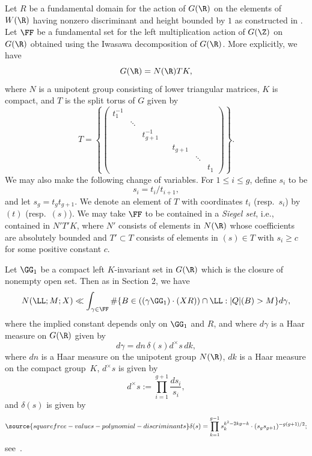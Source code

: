 Let $R$ be a fundamental domain for the action of $G(\R)$ on the elements of $W(\R)$ having nonzero discriminant and height bounded by $1$ as constructed in \cite[\S4.1]{SW}. Let $\FF$ be a fundamental set for the left multiplication action of $G(\Z)$ on $G(\R)$ obtained using the Iwasawa decomposition of $G(\R)$. More explicitly, we have
$$
G(\R)=N(\R)TK,
$$ where $N$ is a unipotent group consisting of lower triangular matrices, $K$ is compact, and $T$ is the split torus of $G$ given by
\begin{equation*}
T=
\left\{\left(\begin{array}{ccccccc}
 t_1^{-1}&&&&&&\\
&\ddots &&&&&  \\
 && t_{g+1}^{-1} &&&&\\
 &&&& \!\!\!\!t_{g+1} &&\\
&&&&&\!\!\!\!\ddots &  \\
& &&&&& \!\!t_{1}
\end{array}\right)\right\}.
\end{equation*}
We may also make the following change of variables.
For $1\leq
i\leq g$, define $s_i$ to be
$$
s_i=t_i/t_{i+1},
$$
and let $s_g=t_gt_{g+1}$.
We denote an element of $T$ with coordinates $t_i$
(resp.\ $s_i$) by $(t)$ (resp.\ $(s)$). We may take $\FF$ to be contained in a {\it Siegel set}, i.e., contained in $N'T'K$,
where $N'$ consists of elements in $N(\R)$ whose coefficients are
absolutely bounded and $T'\subset T$ consists of elements in $(s)\in
T$ with $s_i\geq c$ for some positive constant $c$.

Let $\GG_1$ be a compact left $K$-invariant set in $G(\R)$ which is the closure of nonempty open set. Then as in Section 2, we have
\begin{equation}
  N(\LL;M;X)\ll \int_{\gamma\in\FF} \#\{B\in((\gamma \GG_1)\cdot (XR))\cap\LL:|Q|(B)>M\}
  d\gamma,
\end{equation}
where the implied constant depends only on $\GG_1$ and $R$, and where $d\gamma$ is a Haar measure on $G(\R)$ given by
$$
d\gamma=dn\,\delta(s)d^\times s\,dk,
$$ where $dn$ is a Haar measure on the unipotent group $N(\R)$,
$dk$ is a Haar measure on the compact group~$K$, $d^\times s$ is
given by
$$
d^\times s:=\prod_{i=1}^{g+1}\frac{ds_i}{s_i},
$$
and
$\delta(s)$ is given by
\begin{equation}\label{eqhaareven}
\source{squarefree-values-polynomial-discriminants}
  \delta(s)=\prod_{k=1}^{g-1} s_k^{k^2-2kg-k}\cdot (s_gs_{g+1})^{-g(g+1)/2};
\end{equation}
see~\cite[(20)]{SW}.


